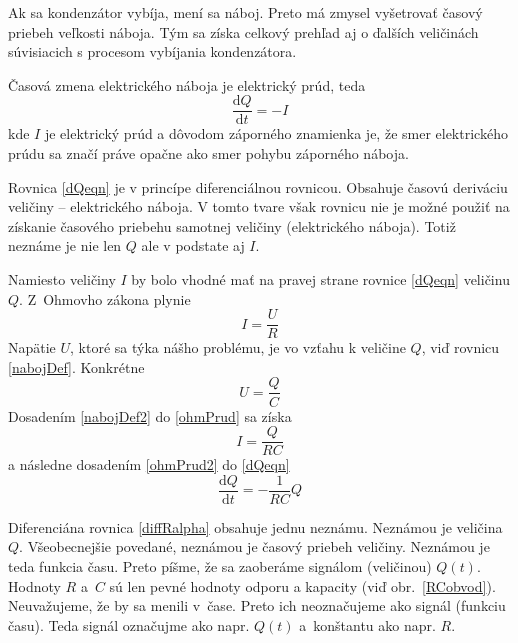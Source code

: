 \documentclass[a4paper, 10pt, ]{article}
\begin{document}
Ak sa kondenzátor vybíja, mení sa náboj. Preto má zmysel vyšetrovať časový priebeh veľkosti náboja. Tým sa získa celkový prehľad aj o ďalších veličinách súvisiacich s procesom vybíjania kondenzátora.

Časová zmena elektrického náboja je elektrický prúd, teda
\begin{equation} \label{dQeqn}
    \frac{\text{d}Q}{\text{d}t} = - I
\end{equation}
kde $I$ je elektrický prúd a dôvodom záporného znamienka je, že smer elektrického prúdu sa značí práve opačne ako smer pohybu záporného náboja.

Rovnica \eqref{dQeqn} je v princípe diferenciálnou rovnicou. Obsahuje časovú deriváciu veličiny -- elektrického náboja. V tomto tvare však rovnicu nie je možné použiť na získanie časového priebehu samotnej veličiny (elektrického náboja). Totiž neznáme je nie len $Q$ ale v podstate aj $I$.



\bigskip

Namiesto veličiny $I$ by bolo vhodné mať na pravej strane rovnice \eqref{dQeqn} veličinu $Q$. Z~Ohmovho zákona plynie
\begin{equation} \label{ohmPrud}
    I = \frac{U}{R}
\end{equation}
Napätie $U$, ktoré sa týka nášho problému, je vo vzťahu k veličine $Q$, viď rovnicu  \eqref{nabojDef}. Konkrétne
\begin{equation} \label{nabojDef2}
    U = \frac{Q}{C}
\end{equation}
Dosadením \eqref{nabojDef2} do \eqref{ohmPrud} sa získa
\begin{equation} \label{ohmPrud2}
    I = \frac{Q}{RC}
\end{equation}
a následne dosadením \eqref{ohmPrud2} do \eqref{dQeqn}
\begin{equation} \label{diffRalpha}
    \frac{\text{d}Q}{\text{d}t} = - \frac{1}{RC} Q
\end{equation}

Diferenciána rovnica \eqref{diffRalpha} obsahuje jednu neznámu. Neznámou je veličina $Q$. Všeobecnejšie povedané, neznámou je časový priebeh veličiny. Neznámou je teda funkcia času. Preto píšme, že sa zaoberáme signálom (veličinou) $Q(t)$. Hodnoty $R$ a~$C$ sú len pevné hodnoty odporu a kapacity (viď obr.~\ref{RCobvod}). Neuvažujeme, že by sa menili v~čase. Preto ich neoznačujeme ako signál (funkciu času). Teda signál označujme ako napr. $Q(t)$ a~konštantu ako napr. $R$.
\end{document}
